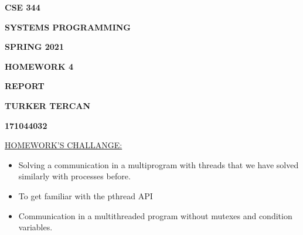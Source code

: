 \documentclass[12pt]{report}
\renewcommand{\_}{\kern-1.5pt\textunderscore\kern-1.5pt}
\begin{document}
\vspace{\baselineskip}
\begin{Center}
{\fontsize{24pt}{28.8pt}\selectfont \textbf{CSE 344}}
\end{Center}
\begin{Center}
{\fontsize{24pt}{28.8pt}\selectfont \textbf{SYSTEMS PROGRAMMING}}
\end{Center}
\begin{Center}
{\fontsize{24pt}{28.8pt}\selectfont \textbf{SPRING 2021}}
\end{Center}

\vspace{\baselineskip}
\begin{Center}
{\fontsize{24pt}{28.8pt}\selectfont \textbf{HOMEWORK 4}}
\end{Center}
\begin{Center}
{\fontsize{24pt}{28.8pt}\selectfont \textbf{REPORT}}
\end{Center}

\vspace{\baselineskip}
\begin{Center}
{\fontsize{24pt}{28.8pt}\selectfont \textbf{TURKER TERCAN}}
\end{Center}
\begin{Center}
{\fontsize{24pt}{28.8pt}\selectfont \textbf{171044032}}
\end{Center}

\vspace{\baselineskip}

\vspace{\baselineskip}

\vspace{\baselineskip}

\vspace{\baselineskip}
\vspace{\baselineskip}
\vspace{\baselineskip}
\vspace{\baselineskip}
\vspace{\baselineskip}
\vspace{\baselineskip}
\vspace{\baselineskip}
\begin{justify}
{\fontsize{16pt}{19.2pt}\selectfont \uline{HOMEWORK’S CHALLANGE:}}
\end{justify}
\begin{itemize}
	\item Solving a communication in a multiprogram with threads that we have solved similarly with processes before.
	\item To get familiar with the pthread API
	\item Communication in a multithreaded program without mutexes and condition variables.
\end{itemize}
\end{document}
